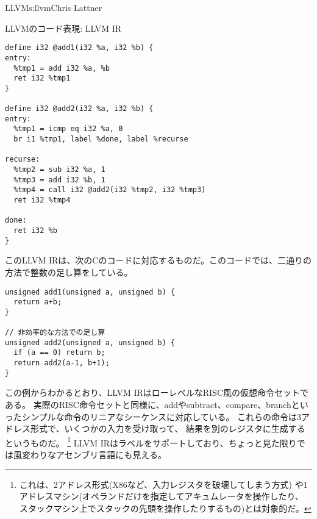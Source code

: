\begin{aosachapter}{LLVM}{s:llvm}{Chris Lattner}
\begin{aosasect1}{LLVMのコード表現: LLVM IR}
\begin{verbatim}
define i32 @add1(i32 %a, i32 %b) {
entry:
  %tmp1 = add i32 %a, %b
  ret i32 %tmp1
}

define i32 @add2(i32 %a, i32 %b) {
entry:
  %tmp1 = icmp eq i32 %a, 0
  br i1 %tmp1, label %done, label %recurse

recurse:
  %tmp2 = sub i32 %a, 1
  %tmp3 = add i32 %b, 1
  %tmp4 = call i32 @add2(i32 %tmp2, i32 %tmp3)
  ret i32 %tmp4

done:
  ret i32 %b
}
\end{verbatim}

\noindent
このLLVM IRは、次のCのコードに対応するものだ。このコードでは、二通りの方法で整数の足し算をしている。


\begin{verbatim}
unsigned add1(unsigned a, unsigned b) {
  return a+b;
}

// 非効率的な方法での足し算
unsigned add2(unsigned a, unsigned b) {
  if (a == 0) return b;
  return add2(a-1, b+1);
}
\end{verbatim}

\noindent
この例からわかるとおり、LLVM IRはローレベルなRISC風の仮想命令セットである。
実際のRISC命令セットと同様に、addやsubtract、compare、branchといったシンプルな命令のリニアなシーケンスに対応している。
これらの命令は3アドレス形式で、いくつかの入力を受け取って、
結果を別のレジスタに生成するというものだ。
\footnote{これは、2アドレス形式(X86など、入力レジスタを破壊してしまう方式)
や1アドレスマシン(オペランドだけを指定してアキュムレータを操作したり、
スタックマシン上でスタックの先頭を操作したりするもの)とは対象的だ。}
LLVM IRはラベルをサポートしており、ちょっと見た限りでは風変わりなアセンブリ言語にも見える。


\end{aosasect1}
\end{aosachapter}
